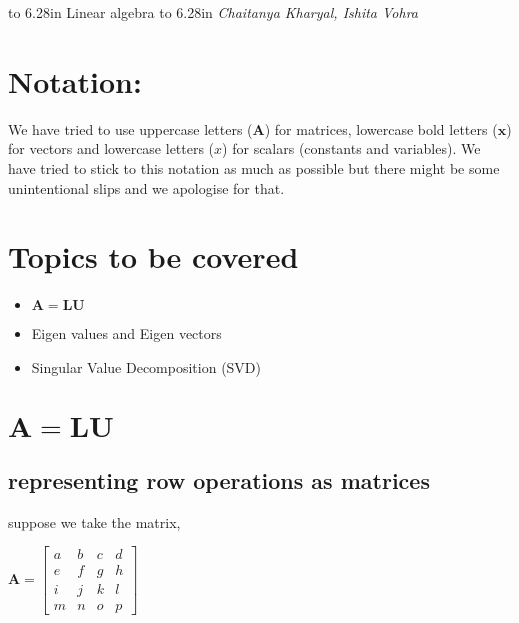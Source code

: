 \documentclass[a4paper]{article}
\begin{document}
\pagestyle{myheadings}
   \thispagestyle{plain}
   \newpage
   \noindent
   \begin{center}
   \framebox
   {
      \vbox{\vspace{2mm}
        \hbox to 6.28in { {\Large \hfill Linear algebra \hfill} } %
        \vspace{2mm}
        \hbox to 6.28in { {\it Chaitanya Kharyal, Ishita Vohra \hfill} } %
        \vspace{2mm}}
   }
   \end{center}
   \markboth{}{} %

\section{Notation:}
We have tried to use uppercase letters ($\mathbf{A}$) for matrices, lowercase bold letters ($\mathbf{x}$) for vectors and lowercase letters ($x$) for scalars (constants and variables). We have tried to stick to this notation as much as possible but there might be some unintentional slips and we apologise for that.

\section{Topics to be covered}
\begin{itemize}
    \item $\mathbf{A} = \mathbf{L}\mathbf{U}$
    \item Eigen values and Eigen vectors
    \item Singular Value Decomposition (SVD)
\end{itemize}

\section{$\mathbf{A} = \mathbf{L}\mathbf{U}$}
    \subsection{representing row operations as matrices}
        suppose we take the matrix,
        \begin{center}
            $
            \mathbf{A} = 
            \begin{bmatrix}
                a & b & c & d \\ 
                e & f & g & h \\
                i & j & k & l \\
                m & n & o & p 
            \end{bmatrix}
            $
        \end{center}
        
\end{document}
